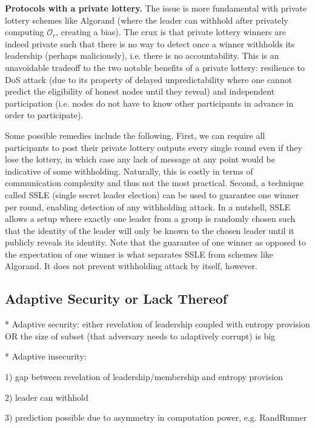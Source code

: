 \documentclass[letterpaper,twocolumn,10pt]{article}
\theoremstyle{definition}
\theoremstyle{remark}
\begin{document}
\noindent\textbf{Protocols with a private lottery.} The issue is more fundamental with private lottery schemes like Algorand (where the leader can withhold after privately computing $\mathcal{O}_r$, creating a bias). The crux is that private lottery winners are indeed private such that there is no way to detect once a winner withholds its leadership (perhaps maliciously), i.e. there is no accountability. This is an unavoidable tradeoff to the two notable benefits of a private lottery: resilience to DoS attack (due to its property of delayed unpredictability \cite{azouvi2018winning} where one cannot predict the eligibility of honest nodes until they reveal) and independent participation (i.e. nodes do not have to know other participants in advance in order to participate).

Some possible remedies include the following. First, we can require all participants to post their private lottery outputs every single round even if they lose the lottery, in which case any lack of message at any point would be indicative of some withholding. Naturally, this is costly in terms of communication complexity and thus not the most practical. Second, a technique called SSLE (single secret leader election) \cite{boneh2020single} can be used to guarantee one winner per round, enabling detection of any withholding attack. In a nutshell, SSLE allows a setup where exactly one leader from a group is randomly chosen such that the identity of the leader will only be known to the chosen leader until it publicly reveals its identity. Note that the guarantee of one winner as opposed to the expectation of one winner is what separates SSLE from schemes like Algorand. It does not prevent withholding attack by itself, however.

\subsection{Adaptive Security or Lack Thereof}
* Adaptive security: either revelation of leadership coupled with entropy provision OR the size of subset (that adversary needs to adaptively corrupt) is big

* Adaptive insecurity:

1) gap between revelation of leadership/membership and entropy provision

2) leader can withhold

3) prediction possible due to asymmetry in computation power, e.g. RandRunner
\end{document}
